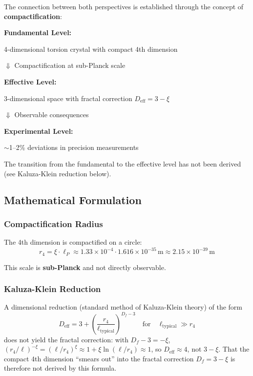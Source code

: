 	The connection between both perspectives is established through the concept of \textbf{compactification}:
	
	\begin{keyresult}
		\textbf{Fundamental Level:}
		\begin{center}
			4-dimensional torsion crystal with compact 4th dimension
		\end{center}
		
		$\Downarrow$ \quad Compactification at sub-Planck scale
		
		\textbf{Effective Level:}
		\begin{center}
			3-dimensional space with fractal correction $D_{\text{eff}} = 3 - \xi$
		\end{center}
		
		$\Downarrow$ \quad Observable consequences
		
		\textbf{Experimental Level:}
		\begin{center}
			$\sim$1--2\% deviations in precision measurements
		\end{center}
	\end{keyresult}
	
	The transition from the fundamental to the effective level has not been derived (see Kaluza-Klein reduction below).
	
	\subsection{Mathematical Formulation}
	
	\subsubsection{Compactification Radius}
	
	The 4th dimension is compactified on a circle:
\begin{equation}
	r_4 = \xi \cdot \ell_P \approx 1.33 \times 10^{-4} \cdot 1.616 \times 10^{-35}\,\text{m} \approx 2.15 \times 10^{-39}\,\text{m}
\end{equation}
	
	This scale is \textbf{sub-Planck} and not directly observable.
	
	\subsubsection{Kaluza-Klein Reduction}
	
	A dimensional reduction (standard method of Kaluza-Klein theory) of the form
	\begin{equation}
		D_{\text{eff}} = 3 + \left(\frac{r_4}{\ell_{\text{typical}}}\right)^{D_f-3} \quad \text{for} \quad \ell_{\text{typical}} \gg r_4
	\end{equation}
	does not yield the fractal correction: with $D_f - 3 = -\xi$, $(r_4/\ell)^{-\xi} = (\ell/r_4)^{\xi} \approx 1 + \xi \ln(\ell/r_4) \approx 1$, so $D_{\text{eff}} \approx 4$, not $3 - \xi$. That the compact 4th dimension \enquote{smears out} into the fractal correction $D_f = 3-\xi$ is therefore not derived by this formula.
	
